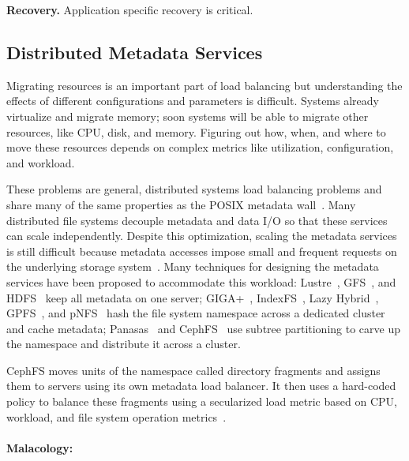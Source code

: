 \documentclass[10pt,twocolumn]{article}
\begin{document}
{\bf Recovery.} Application specific recovery is critical.

\subsection{Distributed Metadata Services}
\label{malacology:mds}

Migrating resources is an important part of load balancing but understanding the effects of different configurations and parameters is difficult. Systems already virtualize and migrate memory; soon systems will be able to migrate other resources, like CPU, disk, and memory. Figuring out how, when, and where to move these resources depends on complex metrics like utilization, configuration, and workload.

These problems are general, distributed systems load balancing problems and share many of the same properties as the POSIX metadata wall~\cite{alam:pdsw2011-metadata-scaling,ghemawat:sosp2003-gfs,hildebrand:msst2005-pnfs,weil_ceph_2006,welch:fast2008-panasas,shvachko:login2012-hdfs-scalability}. Many distributed file systems decouple metadata and data I/O so that
these services can scale independently. Despite
this optimization, scaling the metadata services is still difficult
because metadata accesses impose small and frequent requests on the
underlying storage system~\cite{roselli:atec2000-FS-workloads}. Many
techniques for designing the metadata services have been proposed to
accommodate this workload: Lustre~\cite{konstantinos:pdsw2014-lustre-metadata}, GFS~\cite{ghemawat:sosp2003-gfs}, and HDFS~\cite{shvachko:login2012-hdfs-scalability} keep all metadata on one
server; GIGA+~\cite{patil:fast2011-giga}, IndexFS~\cite{ren:sc2014-indexfs}, Lazy Hybrid~\cite{brandt:msst2003-lh}, GPFS~\cite{schmuck:fast2002-gpfs},
and pNFS~\cite{hildebrand:supercomputing2006-pNFS} hash the file
system namespace across a dedicated cluster and cache metadata; Panasas~\cite{welch:fast2008-panasas} and CephFS~\cite{weil:sc2004-dyn-metadata} use subtree partitioning to carve up the namespace and distribute it across a cluster.

CephFS moves units of the namespace called directory fragments and assigns them to servers using  its own metadata load balancer. It then uses a hard-coded policy to balance these fragments using a secularized load metric based on CPU, workload, and file system operation metrics~\cite{sevilla:sc15-mantle}.

\paragraph*{Malacology:}
\end{document}
